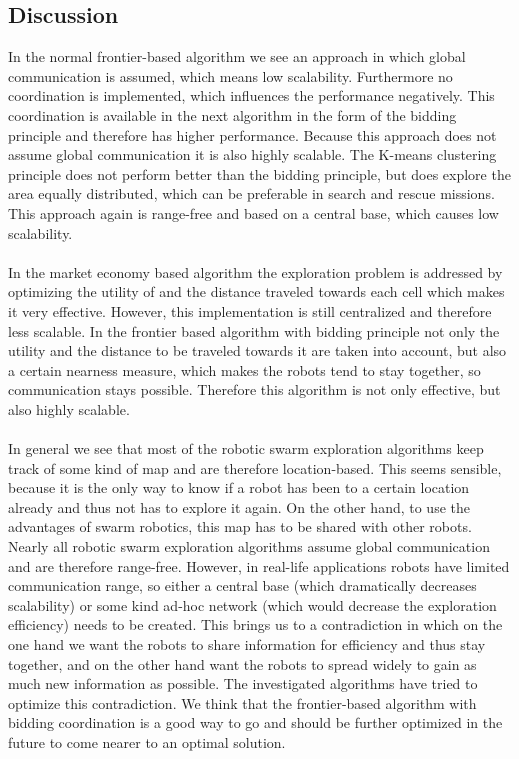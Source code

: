 \subsection{Discussion}
  In the normal frontier-based algorithm we see an approach in which global communication is assumed, which means low scalability. Furthermore no coordination is implemented, which influences the performance negatively. This coordination is available in the next algorithm in the form of the bidding principle and therefore has higher performance. Because this approach does not assume global communication it is also highly scalable. The K-means clustering principle does not perform better than the bidding principle, but does explore the area equally distributed, which can be preferable in search and rescue missions. This approach again is range-free and based on a central base, which causes low scalability.\\
  \\
  In the market economy based algorithm the exploration problem is addressed by optimizing the utility of and the distance traveled towards each cell which makes it very effective. However, this implementation is still centralized and therefore less scalable. In the frontier based algorithm with bidding principle not only the utility and the distance to be traveled towards it are taken into account, but also a certain nearness measure, which makes the robots tend to stay together, so communication stays possible. Therefore this algorithm is not only effective, but also highly scalable.\\
  \\
  In general we see that most of the robotic swarm exploration algorithms keep track of some kind of map and are therefore location-based.
  This seems sensible, because it is the only way to know if a robot has been to a certain location already and thus not has to explore it again.
  On the other hand, to use the advantages of swarm robotics, this map has to be shared with other robots.
  Nearly all robotic swarm exploration algorithms assume global communication and are therefore range-free.
  However, in real-life applications robots have limited communication range, so either a central base (which dramatically decreases scalability) or some kind ad-hoc network (which would decrease the exploration efficiency) needs to be created.
  This brings us to a contradiction in which on the one hand we want the robots to share information for efficiency and thus stay together, and on the other hand want the robots to spread widely to gain as much new information as possible.
  The investigated algorithms have tried to optimize this contradiction. We think that the frontier-based algorithm with bidding coordination is a good way to go and should be further optimized in the future to come nearer to an optimal solution.


